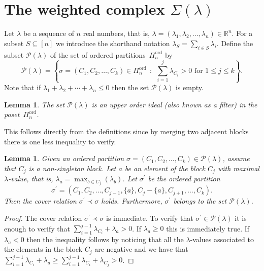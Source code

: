 \documentclass[10pt]{amsart}
\newtheorem{lemma}[theorem]{Lemma}
\theoremstyle{definition}
\newcommand{\Rrr}{\mathbb{R}}
\DeclareMathOperator{\ord}{ord}
\newcommand{\coveredby}{\prec}
\newcommand{\Qn}{\Pi^{\ord}_{n}}
\newcommand{\lambdasumnonpositive}
{\lambda_{1} + \lambda_{2} + \cdots + \lambda_{n} \leq 0}
\begin{document}
\section{The weighted complex \texorpdfstring{$\Sigma(\lambda)$}{Sigma(lambda)}}
\label{section_the_weighted_complex}

Let $\lambda$ be a sequence of $n$ real numbers,
that is, $\lambda = (\lambda_{1}, \lambda_{2}, \ldots, \lambda_{n}) \in \Rrr^{n}$.
For a subset $S \subseteq [n]$ we introduce the shorthand notation
$\lambda_{S} = \sum_{i \in S} \lambda_{i}$.
Define the subset $\mathcal{P}(\lambda)$ of the set of ordered 
partitions~$\Qn$ by
$$
\mathcal{P}(\lambda)
=
\left\{ \sigma = (C_{1}, C_{2}, \ldots, C_{k}) \in \Qn \:\: : \:\:
\sum_{i=1}^{j} \lambda_{C_{i}} > 0 \text{ for } 1 \leq j \leq k \right\} .
$$
Note that if $\lambdasumnonpositive$
then the set $\mathcal{P}(\lambda)$ is empty.


\begin{lemma}
The set $\mathcal{P}(\lambda)$ is an upper order ideal (also
known as a filter)
in the poset~$\Qn$.
\end{lemma}
This follows directly from the definitions
since by merging two adjacent blocks
there is one less inequality to verify.

\begin{lemma}
Given an ordered partition
$\sigma = (C_{1}, C_{2}, \ldots, C_{k}) \in \mathcal{P}(\lambda)$,
assume that $C_{j}$ is a non-singleton block.
Let $a$ be an element of the block $C_{j}$
with maximal $\lambda$-value,
that is,
$\lambda_{a} = \max_{b \in C_{j}}(\lambda_{b})$.
Let $\sigma^{\prime}$ be the ordered partition
$$
\sigma^{\prime}
=
(C_{1}, C_{2}, \ldots, C_{j-1}, \{a\}, C_{j} - \{a\}, C_{j+1}, \ldots, C_{k}) .
$$
Then the cover relation $\sigma^{\prime} \coveredby \sigma$ holds.
Furthermore, $\sigma^{\prime}$ belongs to the set $\mathcal{P}(\lambda)$.
\label{lemma_split}
\end{lemma}
\begin{proof}
The cover relation $\sigma^{\prime} \coveredby \sigma$ is immediate.
To verify that
$\sigma^{\prime} \in \mathcal{P}(\lambda)$
it is enough to verify that
$\sum_{i=1}^{j-1} \lambda_{C_{i}} + \lambda_{a} > 0$.
If $\lambda_{a} \geq 0$ this is immediately true.
If $\lambda_{a} < 0$ then
the inequality follows by noticing that all the 
$\lambda$-values associated to
the elements in the block $C_{j}$
are negative and we have that
$\sum_{i=1}^{j-1} \lambda_{C_{i}} + \lambda_{a} \geq
\sum_{i=1}^{j-1} \lambda_{C_{i}} + \lambda_{C_{j}} > 0$.
\end{proof}
\end{document}
